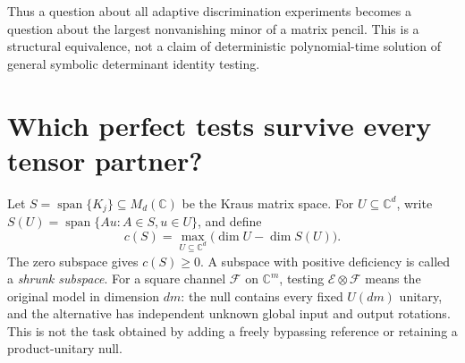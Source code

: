 \documentclass[11pt,a4paper]{article}
\theoremstyle{remark}\newtheorem{remark}[theorem]{Remark}
\newcommand{\E}{\mathcal E}
\newcommand{\CC}{\mathbb C}
\begin{document}
Thus a question about all adaptive discrimination experiments becomes a question about the largest nonvanishing minor of a matrix pencil. This is a structural equivalence, not a claim of deterministic polynomial-time solution of general symbolic determinant identity testing.


\section{Which perfect tests survive every tensor partner?}\label{sec:stability}
Let $S=\operatorname{span}\{K_j\}\subseteq M_d(\CC)$ be the Kraus matrix space. For $U\subseteq\CC^d$, write $S(U)=\operatorname{span}\{Au:A\in S,u\in U\}$, and define
\[
c(S)=\max_{U\subseteq\CC^d}\bigl(\dim U-\dim S(U)\bigr).
\]
The zero subspace gives $c(S)\ge0$. A subspace with positive deficiency is called a \emph{shrunk subspace}. For a square channel $\mathcal F$ on $\CC^m$, testing $\E\otimes\mathcal F$ means the original model in dimension $dm$: the null contains every fixed $U(dm)$ unitary, and the alternative has independent unknown global input and output rotations. This is not the task obtained by adding a freely bypassing reference or retaining a product-unitary null.
\end{document}
